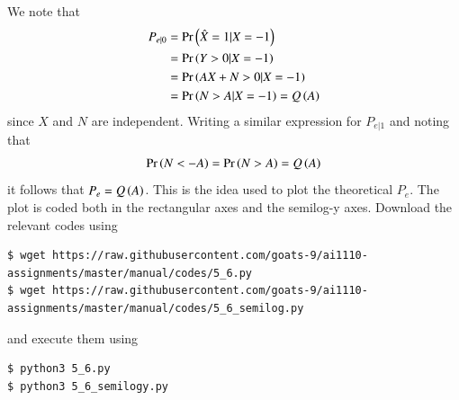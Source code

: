 \documentclass[journal,12pt,twocolumn]{IEEEtran}
\renewcommand\thesection{\arabic{section}}
\begin{document}
\begin{enumerate}[label=\thesection.\arabic*
,ref=\thesection.\theenumi]
\solution
We note that 
\begin{align}
	P_{e|0} &= \Pr\left(\hat{X} = 1 | X = -1\right)\\
	&= \Pr\left(Y > 0 | X = -1\right) \\
	&= \Pr\left(AX + N > 0 | X = -1\right) \label{eq:thresh} \\
	&= \Pr\left(N > A | X = -1\right) = Q\left(A\right)
\end{align}
since $X$ and $N$ are independent. Writing a similar expression for $P_{e|1}$ and noting that 
\begin{align}
	\Pr\left(N < -A\right) = \Pr\left(N > A\right) = Q\left(A\right)
\end{align}
it follows that $P_e = Q\left(A\right)$. This is the idea used to plot the theoretical $P_e$. The plot is coded both in the rectangular axes and the semilog-y axes. Download the relevant codes using 
\begin{lstlisting}
$ wget https://raw.githubusercontent.com/goats-9/ai1110-assignments/master/manual/codes/5_6.py
$ wget https://raw.githubusercontent.com/goats-9/ai1110-assignments/master/manual/codes/5_6_semilog.py
\end{lstlisting}
and execute them using
\begin{lstlisting}
$ python3 5_6.py
$ python3 5_6_semilogy.py
\end{lstlisting}


\end{enumerate}
\end{document}
